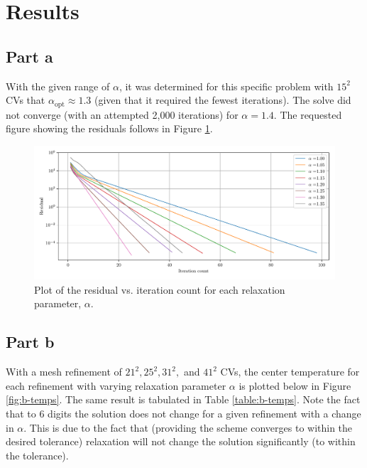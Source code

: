 \documentclass{article}
\begin{document}
\section*{Results}

\subsection*{Part a}

With the given range of $\alpha$, it was determined for this specific problem with $15^2$ CVs that $\alpha_\text{opt} \approx 1.3$ (given that it required the fewest iterations). The solve did not converge (with an attempted 2,000 iterations) for $\alpha = 1.4$. The requested figure showing the residuals follows in Figure \ref{fig:a}.

\begin{figure}[H]
	\centering
	\includegraphics[width=\linewidth]{../results/a}
	\caption{Plot of the residual vs. iteration count for each relaxation parameter, $\alpha$.}
	\label{fig:a}
\end{figure}

\subsection*{Part b}

With a mesh refinement of $21^2, 25^2, 31^2,$ and $41^2$ CVs, the center temperature for each refinement with varying relaxation parameter $\alpha$ is plotted below in Figure \ref{fig:b-temps}. The same result is tabulated in Table \ref{table:b-temps}. Note the fact that to 6 digits the solution does not change for a given refinement with a change in $\alpha$. This is due to the fact that (providing the scheme converges to within the desired tolerance) relaxation will not change the solution significantly (to within the tolerance).
\end{document}
